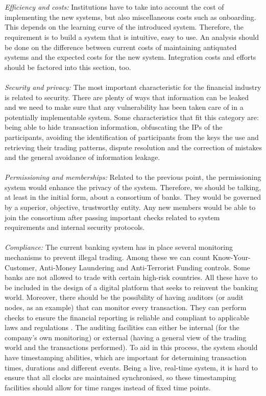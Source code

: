 \documentclass[12pt,twoside]{article}
\begin{document}
\\ \\
\textit{Efficiency and costs:} Institutions have to take into account the cost of implementing the new systems, but also miscellaneous costs such as onboarding. This depends on the learning curve of the introduced system. Therefore, the requirement is to build a system that is intuitive, easy to use. An analysis should be done on the difference between current costs of maintaining antiquated systems and the expected costs for the new system. Integration costs and efforts should be factored into this section, too.
\\ \\
\textit{Security and privacy:} The most important characteristic for the financial industry is related to security. There are plenty of ways that information can be leaked and we need to make sure that any vulnerability has been taken care of in a potentially implementable system. Some characteristics that fit this category are: being able to hide transaction information, obfuscating the IPs of the participants, avoiding the identification of participants from the keys the use and retrieving their trading patterns, dispute resolution and the correction of mistakes and the general avoidance of information leakage. 
\\ \\
\textit{Permissioning and memberships:} Related to the previous point, the permissioning system would enhance the privacy of the system. Therefore, we should be talking, at least in the initial form, about a consortium of banks. They would be governed by a superior, objective, trustworthy entity. Any new members would be able to join the consortium after passing important checks related to system requirements and internal security protocols.
\\ \\
\textit{Compliance:} The current banking system has in place several monitoring mechanisms to prevent illegal trading. Among these we can count Know-Your-Customer, Anti-Money Laundering and Anti-Terrorist Funding controls. Some banks are not allowed to trade with certain high-risk countries. All these have to be included in the design of a digital platform that seeks to reinvent the banking world. Moreover, there should be the possibility of having auditors (or audit nodes, as an example) that can monitor every transaction. They can perform checks to ensure the financial reporting is reliable and compliant to applicable laws and regulations \cite{GS:Audit}. The auditing facilities can either be internal (for the company's own monitoring) or external (having a general view of the trading world and the transactions performed). To aid in this process, the system should have timestamping abilities, which are important for determining transaction times, durations and different events. Being a live, real-time system, it is hard to ensure that all clocks are maintained synchronised, so these timestamping facilities should allow for time ranges instead of fixed time points. 
\end{document}
